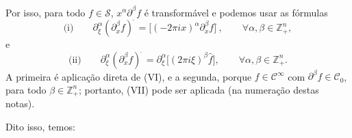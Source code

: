 \documentclass[../distribution_theory_notes.tex]{subfiles}
\begin{document}
Por isso, para todo \(f\in \mathcal{S}\), \(x^{\alpha }\partial ^{\beta }f\) é transformável e podemos usar as fórmulas
\[
	\text{(i)}\qquad
	\partial _{\xi }^{\alpha }(\partial _{x}^{\beta }f)^{\widehat{\; }}
	=\bigl[(-2\pi i x)^{\alpha }\partial _{x}^{\beta }f\bigr]^{\widehat{\; }},
	\qquad \forall \alpha ,\beta \in \mathbb{Z}_{+}^{n},
\]
e
\[
	\text{(ii)}\qquad
	\partial _{\xi }^{\alpha }(\partial _{x}^{\beta }f)^{\widehat{\; }}
	=\partial _{\xi }^{\alpha }\bigl[(2\pi i\xi )^{\beta }\hat{f}\bigr],
	\qquad \forall \alpha ,\beta \in \mathbb{Z}_{+}^{n}.
\]
A primeira é aplicação direta de (VI), e a segunda, porque \(f\in \mathcal{C}^{\infty}\) com \(\partial ^{\beta }f\in \mathcal{C}_{0}\), para todo \(\beta \in \mathbb{Z}_{+}^{n}\); portanto, (VII) pode ser aplicada (na numeração destas notas).

Dito isso, temos:
\end{document}
